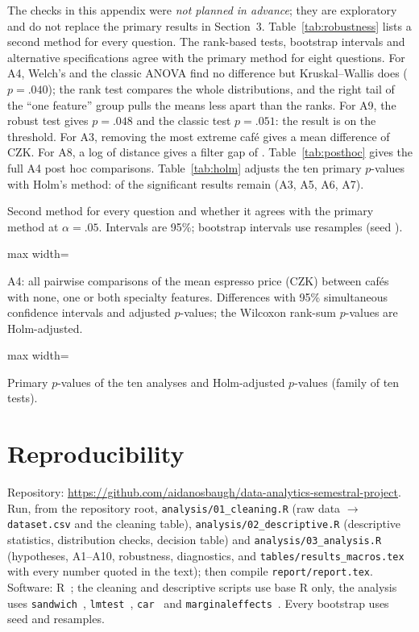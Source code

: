 \documentclass[11pt,a4paper]{article}
\newcommand{\fittable}[1]{\begin{adjustbox}{max width=\textwidth}\end{adjustbox}}
\begin{document}
The checks in this appendix were \emph{not planned in advance}; they are exploratory and do not replace the primary results in Section~3. Table~\ref{tab:robustness} lists a second method for every question. The rank-based tests, bootstrap intervals and alternative specifications agree with the primary method for eight questions. For A4, Welch's and the classic ANOVA find no difference but Kruskal--Wallis does ($p = .040$); the rank test compares the whole distributions, and the right tail of the ``one feature'' group pulls the means less apart than the ranks. For A9, the robust test gives $p = .048$ and the classic test $p = .051$: the result is on the threshold. For A3, removing the most extreme caf\'e gives a mean difference of \AthreeTrim\,CZK. For A8, a log of distance gives a filter gap of \AeightLog. Table~\ref{tab:posthoc} gives the full A4 post hoc comparisons. Table~\ref{tab:holm} adjusts the ten primary $p$-values with Holm's method: \HolmSig{} of the \RawSig{} significant results remain (A3, A5, A6, A7).

\begin{table}[H]
\centering\small
\caption{Second method for every question and whether it agrees with the primary method at $\alpha = .05$. Intervals are 95\%; bootstrap intervals use \Boot{} resamples (seed \Seed).}
\label{tab:robustness}
\fittable{D_robustness.tex}
\end{table}

\begin{table}[H]
\centering\small
\caption{A4: all pairwise comparisons of the mean espresso price (CZK) between caf\'es with none, one or both specialty features. Differences with 95\% simultaneous confidence intervals and adjusted $p$-values; the Wilcoxon rank-sum $p$-values are Holm-adjusted.}
\label{tab:posthoc}
\fittable{D_posthoc.tex}
\end{table}

\begin{table}[H]
\centering\small
\caption{Primary $p$-values of the ten analyses and Holm-adjusted $p$-values (family of ten tests).}
\label{tab:holm}

\end{table}

\section{Reproducibility}\label{app:reproducibility}

{\raggedright Repository: \url{https://github.com/aidanosbaugh/data-analytics-semestral-project}. Run, from the repository root, \texttt{analysis/01\_cleaning.R} (raw data $\to$ \texttt{dataset.csv} and the cleaning table), \texttt{analysis/02\_descriptive.R} (descriptive statistics, distribution checks, decision table) and \texttt{analysis/03\_analysis.R} (hypotheses, A1--A10, robustness, diagnostics, and \texttt{tables/results\_macros.tex} with every number quoted in the text); then compile \texttt{report/report.tex}. Software: R~\Rversion; the cleaning and descriptive scripts use base R only, the analysis uses \texttt{sandwich}~\Versandwich, \texttt{lmtest}~\Verlmtest, \texttt{car}~\Vercar{} and \texttt{marginaleffects}~\Vermarginaleffects. Every bootstrap uses seed \Seed{} and \Boot{} resamples.\par}
\end{document}
